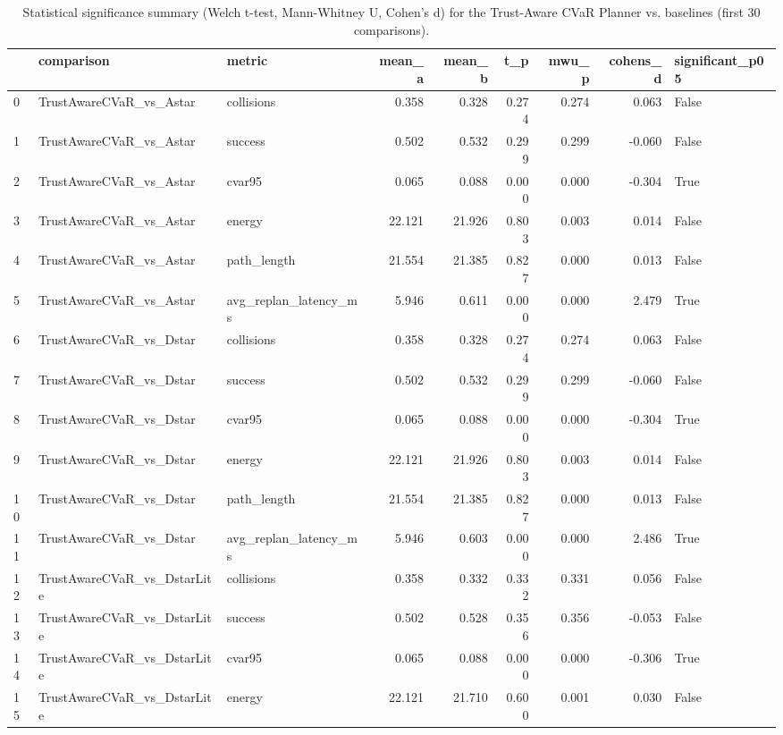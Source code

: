 \begin{table}
\caption{Statistical significance summary (Welch t-test, Mann-Whitney U, Cohen's d) for the Trust-Aware CVaR Planner vs. baselines (first 30 comparisons).}
\label{tab:stats}
\begin{tabular}{lllrrrrrl}
\toprule
 & comparison & metric & mean\_a & mean\_b & t\_p & mwu\_p & cohens\_d & significant\_p05 \\
\midrule
0 & TrustAwareCVaR\_vs\_Astar & collisions & 0.358 & 0.328 & 0.274 & 0.274 & 0.063 & False \\
1 & TrustAwareCVaR\_vs\_Astar & success & 0.502 & 0.532 & 0.299 & 0.299 & -0.060 & False \\
2 & TrustAwareCVaR\_vs\_Astar & cvar95 & 0.065 & 0.088 & 0.000 & 0.000 & -0.304 & True \\
3 & TrustAwareCVaR\_vs\_Astar & energy & 22.121 & 21.926 & 0.803 & 0.003 & 0.014 & False \\
4 & TrustAwareCVaR\_vs\_Astar & path\_length & 21.554 & 21.385 & 0.827 & 0.000 & 0.013 & False \\
5 & TrustAwareCVaR\_vs\_Astar & avg\_replan\_latency\_ms & 5.946 & 0.611 & 0.000 & 0.000 & 2.479 & True \\
6 & TrustAwareCVaR\_vs\_Dstar & collisions & 0.358 & 0.328 & 0.274 & 0.274 & 0.063 & False \\
7 & TrustAwareCVaR\_vs\_Dstar & success & 0.502 & 0.532 & 0.299 & 0.299 & -0.060 & False \\
8 & TrustAwareCVaR\_vs\_Dstar & cvar95 & 0.065 & 0.088 & 0.000 & 0.000 & -0.304 & True \\
9 & TrustAwareCVaR\_vs\_Dstar & energy & 22.121 & 21.926 & 0.803 & 0.003 & 0.014 & False \\
10 & TrustAwareCVaR\_vs\_Dstar & path\_length & 21.554 & 21.385 & 0.827 & 0.000 & 0.013 & False \\
11 & TrustAwareCVaR\_vs\_Dstar & avg\_replan\_latency\_ms & 5.946 & 0.603 & 0.000 & 0.000 & 2.486 & True \\
12 & TrustAwareCVaR\_vs\_DstarLite & collisions & 0.358 & 0.332 & 0.332 & 0.331 & 0.056 & False \\
13 & TrustAwareCVaR\_vs\_DstarLite & success & 0.502 & 0.528 & 0.356 & 0.356 & -0.053 & False \\
14 & TrustAwareCVaR\_vs\_DstarLite & cvar95 & 0.065 & 0.088 & 0.000 & 0.000 & -0.306 & True \\
15 & TrustAwareCVaR\_vs\_DstarLite & energy & 22.121 & 21.710 & 0.600 & 0.001 & 0.030 & False \\

\end{tabular}
\end{table}
